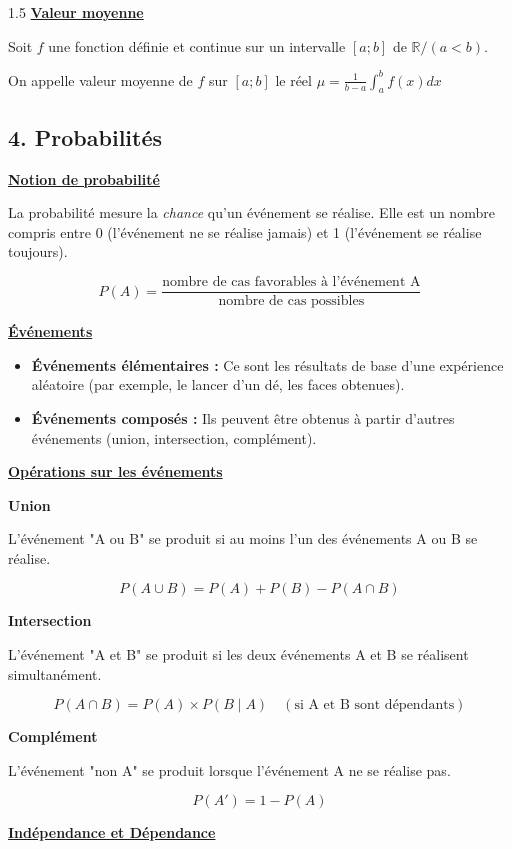 \documentclass[12pt]{article}
\begin{document}
\begin{spacing}{1.5}
 \textbf{\underline{Valeur moyenne}}
 
 Soit $f$ une fonction définie et continue sur un intervalle $[a;b]$ de $\mathbb{R}/(a < b )$.
 
 On appelle valeur moyenne de $f$ sur $[a;b]$ le réel \(\mu=\frac{1}{b-a}\int_a^bf(x)dx\)

\subsection*{4. Probabilités}

\textbf{\underline{ Notion de probabilité}}

La probabilité mesure la \textit{chance} qu'un événement se réalise. Elle est un nombre compris entre 0 (l'événement ne se réalise jamais) et 1 (l'événement se réalise toujours).

\[
P(A) = \frac{\text{nombre de cas favorables à l'événement A}}{\text{nombre de cas possibles}}
\]

\textbf{\underline{Événements}}

\begin{itemize}
    \item \textbf{Événements élémentaires :} Ce sont les résultats de base d'une expérience aléatoire (par exemple, le lancer d'un dé, les faces obtenues).
    \item \textbf{Événements composés :} Ils peuvent être obtenus à partir d'autres événements (union, intersection, complément).
\end{itemize}

\textbf{\underline{Opérations sur les événements}}

\textbf{Union}

L'événement "A ou B" se produit si au moins l'un des événements A ou B se réalise.

\[
P(A \cup B) = P(A) + P(B) - P(A \cap B)
\]

\textbf{Intersection}

L'événement "A et B" se produit si les deux événements A et B se réalisent simultanément.

\[
P(A \cap B) = P(A) \times P(B \mid A) \quad (\text{si A et B sont dépendants})
\]

\textbf{Complément}

L'événement "non A" se produit lorsque l'événement A ne se réalise pas.

\[
P(A') = 1 - P(A)
\]

\textbf{\underline{Indépendance et Dépendance}}


\end{spacing}
\end{document}

